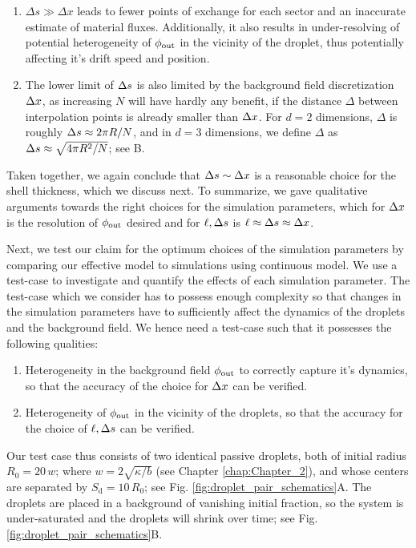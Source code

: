 \begin{enumerate}
    \item $\Delta s \gg \Delta x$ leads to fewer points of exchange for each sector and an inaccurate estimate of material fluxes. 
    Additionally, it also results in under-resolving of potential heterogeneity of $\phi_\mathrm{out}$ in the vicinity of the droplet, thus potentially affecting it's drift speed and position.
    
    \item The lower limit of $\Delta s$ is also limited by the background field discretization $\Delta x$, as increasing $N$ will have hardly any benefit, if the distance $\Delta$ between interpolation points is already smaller than $\Delta x$.
    For $d=2$ dimensions, $\Delta$ is roughly $\Delta s \approx 2\pi R/N$, and in $d=3$ dimensions, we define $\Delta$ as $\Delta s \approx\sqrt{4 \pi R^2 / N}$; see B.

\end{enumerate}
Taken together, we again conclude that $\Delta s \sim \Delta x$ is a reasonable choice for the shell thickness, which we discuss next.
To summarize, we gave qualitative arguments towards the right choices for the simulation parameters, which for $\Delta x$ is the resolution of $\phi_\mathrm{out}$ desired and for $\ell, \Delta s$ is $\ell \approx \Delta s \approx \Delta x$.

Next, we test our claim for the optimum choices of the simulation parameters by comparing our effective model to simulations using continuous model.
We use a test-case to investigate and quantify the effects of each simulation parameter. 
The test-case which we consider has to possess enough complexity so that changes in the simulation parameters have to sufficiently affect the dynamics of the droplets and the background field.
We hence need a test-case such that it possesses the following qualities:

\begin{enumerate}
    \item Heterogeneity in the background field $\phi_\mathrm{out}$ to correctly capture it's dynamics, so that the accuracy of the choice for $\Delta x$ can be verified.

    \item Heterogeneity of $\phi_\mathrm{out}$ in the vicinity of the droplets, so that the accuracy for the choice of $\ell, \Delta s$ can be verified.

\end{enumerate}
Our test case thus consists of two identical passive droplets, both of initial radius $R_0=20\,w$; where $w = 2 \sqrt{\kappa/b}$ (see Chapter \ref{chap:Chapter_2}), and whose centers are separated by $S_\mathrm{d}=10\,R_0$; see Fig. \ref{fig:droplet_pair_schematics}A.
The droplets are placed in a background of vanishing initial fraction, so the system is under-saturated and the droplets will shrink over time; see Fig. \ref{fig:droplet_pair_schematics}B.

